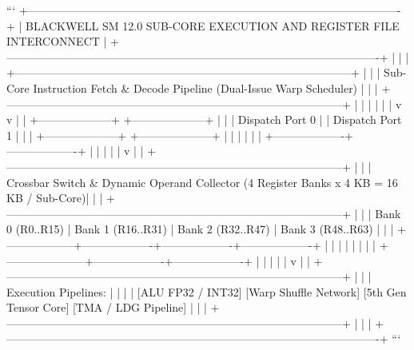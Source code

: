 \documentclass[11pt,twoside,openright]{amsbook}
\begin{document}
{{{{{{{```
+----------------------------------------------------------------------------------------------------+
| BLACKWELL SM 12.0 SUB-CORE EXECUTION AND REGISTER FILE INTERCONNECT                               |
+----------------------------------------------------------------------------------------------------+
|                                                                                                    |
|    +------------------------------------------------------------------------------------------+    |
|    | Sub-Core Instruction Fetch & Decode Pipeline (Dual-Issue Warp Scheduler)                 |    |
|    +------------------------------------------------------------------------------------------+    |
|               |                                       |                                            |
|               v                                       v                                            |
|    +--------------------+                  +--------------------+                                  |
|    | Dispatch Port 0    |                  | Dispatch Port 1    |                                  |
|    +--------------------+                  +--------------------+                                  |
|               |                                       |                                            |
|               +-------------------+-------------------+                                            |
|                                   |                                                                |
|                                   v                                                                |
|    +------------------------------------------------------------------------------------------+    |
|    | Crossbar Switch & Dynamic Operand Collector (4 Register Banks x 4 KB = 16 KB / Sub-Core)|    |
|    +------------------------------------------------------------------------------------------+    |
|        | Bank 0 (R0..R15) | Bank 1 (R16..R31) | Bank 2 (R32..R47) | Bank 3 (R48..R63) |            |
|        +------------------+-------------------+-------------------+-------------------+            |
|               |                     |                   |                   |                      |
|               +---------------------+-------------------+-------------------+                      |
|                                     |                                                              |
|                                     v                                                              |
|    +------------------------------------------------------------------------------------------+    |
|    | Execution Pipelines:                                                                     |    |
|    |  [ALU FP32 / INT32]   [Warp Shuffle Network]   [5th Gen Tensor Core]   [TMA / LDG Pipeline]  |    |
|    +------------------------------------------------------------------------------------------+    |
|                                                                                                    |
+----------------------------------------------------------------------------------------------------+
```

}}}}}}}
\end{document}

